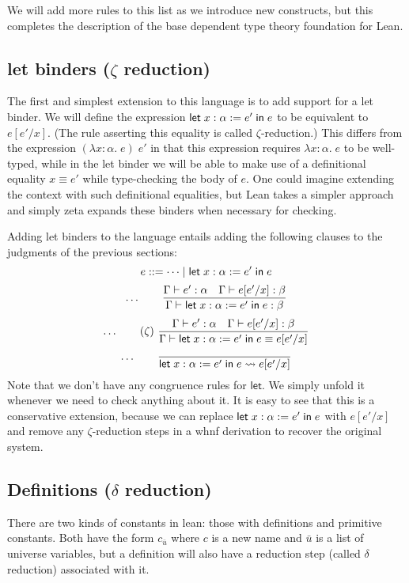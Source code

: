 We will add more rules to this list as we introduce new constructs, but this completes the description of the base dependent type theory foundation for Lean.

\subsection{\textsf{let} binders ($\zeta$ reduction)}

The first and simplest extension to this language is to add support for a let binder. We will define the expression $\mathsf{let}\;x:\alpha:=e'\mathrel{\mathsf{in}}e$ to be equivalent to $e[e'/x]$. (The rule asserting this equality is called $\zeta$-reduction.) This differs from the expression $(\lambda x:\alpha.\;e)\;e'$ in that this expression requires $\lambda x:\alpha.\;e$ to be well-typed, while in the let binder we will be able to make use of a definitional equality $x\equiv e'$ while type-checking the body of $e$. One could imagine extending the context with such definitional equalities, but Lean takes a simpler approach and simply zeta expands these binders when necessary for checking.

Adding let binders to the language entails adding the following clauses to the judgments of the previous sections:
%
$$e::=\dots\mid\mathsf{let}\;x:\alpha:=e'\mathrel{\mathsf{in}}e$$
$$\dots\qquad\frac{\Gamma\vdash e':\alpha\quad \Gamma\vdash e[e'/x]:\beta}{\Gamma\vdash\elet{x:\alpha:=e'}{e}:\beta}$$
$$\dots\qquad(\zeta)\ \frac{\Gamma\vdash e':\alpha\quad \Gamma\vdash e[e'/x]:\beta}{\Gamma\vdash\elet{x:\alpha:=e'}{e}\equiv e[e'/x]}$$
$$\dots\qquad\frac{}{\mathsf{let}\;x:\alpha:=e'\mathrel{\mathsf{in}}e\rightsquigarrow e[e'/x]}$$
Note that we don't have any congruence rules for $\mathsf{let}$. We simply unfold it whenever we need to check anything about it. It is easy to see that this is a conservative extension, because we can replace $\mathsf{let}\;x:\alpha:=e'\mathrel{\mathsf{in}}e$ with $e[e'/x]$ and remove any $\zeta$-reduction steps in a whnf derivation to recover the original system.

\subsection{Definitions ($\delta$ reduction)}

There are two kinds of constants in lean: those with definitions and primitive constants. Both have the form $c_{\bar u}$ where $c$ is a new name and $\bar u$ is a list of universe variables, but a definition will also have a reduction step (called $\delta$ reduction) associated with it.

